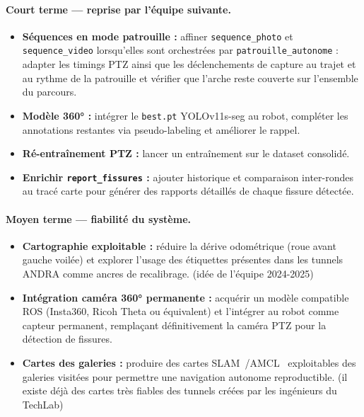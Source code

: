\documentclass[12pt,a4paper]{article}
\begin{document}
\paragraph{Court terme — reprise par l'équipe suivante.}
\begin{itemize}
    \item \textbf{Séquences en mode patrouille :} affiner \texttt{sequence\_photo} et \texttt{sequence\_video} lorsqu'elles sont orchestrées par \texttt{patrouille\_autonome} : adapter les timings PTZ ainsi que les déclenchements de capture au trajet et au rythme de la patrouille et vérifier que l'arche reste couverte sur l'ensemble du parcours.
    \item \textbf{Modèle 360° :} intégrer le \texttt{best.pt} YOLOv11s-seg au robot, compléter les annotations restantes via pseudo-labeling et améliorer le rappel.
    \item \textbf{Ré-entraînement PTZ :} lancer un entraînement sur le dataset consolidé.
    \item \textbf{Enrichir \texttt{report\_fissures} :} ajouter historique et comparaison inter-rondes au tracé carte pour générer des rapports détaillés de chaque fissure détectée.
\end{itemize}

\paragraph{Moyen terme — fiabilité du système.}
\begin{itemize}
    \item \textbf{Cartographie exploitable :} réduire la dérive odométrique (roue avant gauche voilée) et explorer l'usage des étiquettes présentes dans les tunnels ANDRA comme ancres de recalibrage. (idée de l'équipe 2024-2025)
    \item \textbf{Intégration caméra 360° permanente :} acquérir un modèle compatible ROS (Insta360, Ricoh Theta ou équivalent) et l'intégrer au robot comme capteur permanent, remplaçant définitivement la caméra PTZ pour la détection de fissures.
    \item \textbf{Cartes des galeries :} produire des cartes SLAM~\cite{slam_toolbox}/AMCL~\cite{nav2_amcl_docs} exploitables des galeries visitées pour permettre une navigation autonome reproductible. (il existe déjà des cartes très fiables des tunnels créées par les ingénieurs du TechLab)
\end{itemize}
\end{document}
